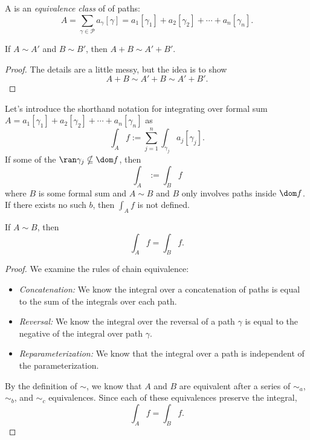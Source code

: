 \begin{definition}
    A  is an \textit{equivalence class}
    of 
    of paths:
    \[ A = \sum_{\gamma \in \mathscr{P}} a_{\gamma} [\gamma]
        = a_1[\gamma_1] + a_2[\gamma_2] + \cdots + a_n[\gamma_n].
    \]
\end{definition}

\begin{theorem}
    If $A \sim A'$ and $B \sim B'$, then $A + B \sim A' + B'$.
\end{theorem}

\begin{proof}
    The details are a little messy, but the idea is to show
    \[ A + B \sim A' + B \sim A' + B'. \]
\end{proof}

Let's introduce the shorthand notation for integrating over formal sum
$A = a_1[\gamma_1] + a_2[\gamma_2] + \cdots + a_n[\gamma_n] $
as
\[ \int_A f := \sum_{j=1}^n \int_{\gamma_j} a_j [\gamma_j]. \]
If some of the $\ran \gamma_j \nsubseteq \dom f$, then 
\[ \int_A := \int_B f \]
where $B$ is some formal sum and $A \sim B$ and $B$ only involves
paths inside $\dom f$.
If there exists no such $b$, then $\int_A f$ is not defined.

\begin{theorem}
    If $A \sim B$, then
    \[ \int_A f = \int_B f. \]
\end{theorem}

\begin{proof}
    We examine the rules of chain equivalence:
    \begin{itemize}
        \item \textit{Concatenation:} We know the integral over
            a concatenation of paths is equal to the sum of the
            integrals over each path.
        \item \textit{Reversal:} We know the integral over the
            reversal of a path $\gamma$ is equal to the negative
            of the integral over path $\gamma$.
        \item \textit{Reparameterization:} We know that
            the integral over a path is independent of the 
            parameterization.
    \end{itemize}
    By the definition of $\sim$, we know that $A$ and $B$
    are equivalent after a series of $\sim_a$, $\sim_b$, and
    $\sim_c$ equivalences.
    Since each of these equivalences preserve the integral,
    \[ \int_A f = \int_B f. \]
\end{proof}

